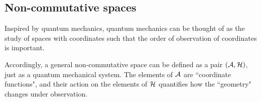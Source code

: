     
%    

\subsection{Non-commutative spaces}
Inspired by quantum mechanics, quantum mechanics can be thought
of as the study of spaces with coordinates such that the order of observation
of coordinates is important. 

Accordingly, a general non-commutative space can be defined
as a pair $(\mathcal{A},\mathcal{H})$, just as a quantum mechanical system.
The elements of $\mathcal{A}$ are ``coordinate functions", and their
action on the elements of $\mathcal{H}$ quantifies how the ``geometry"
changes under observation.


